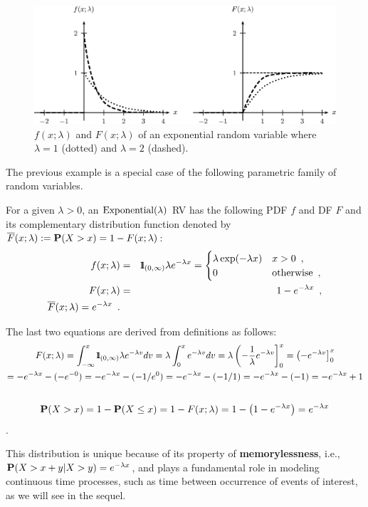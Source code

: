 \begin{figure}[htbp]
\begin{center}
\includegraphics[width=5.0in]{pstricks/exponentialLambdafF}
\caption{$f(x;\lambda)$ and $F(x;\lambda)$ of an exponential random variable where $\lambda=1$ (dotted) and $\lambda=2$ (dashed).}
\end{center}
\end{figure}


The previous example is a special case of the following parametric
family of random variables.

\begin{model}[$\exponential(\lambda)$]\label{M:exponential}
For a given $\lambda > 0$, an $\exponential(\lambda)$ RV has the following PDF $f$ and DF $F$ and its complementary distribution function denoted by $\overline{F}(x; \lambda) := \mathbf{P}(X > x) = 1-F(x;\lambda)$:
\begin{eqnarray}\label{E:Exponentialpdfcdf}
f(x; \lambda) &=& {1}\mspace{-11 mu}{1}_{(0,\infty)} \lambda e^{-\lambda x} =
\begin{cases}
\lambda \exp(-\lambda x) & x>0 \enspace ,\\
0&\textrm{otherwise} \enspace ,
\end{cases}\\
F(x; \lambda) &=& 1-e^{-\lambda x} \enspace ,\\ 
\overline{F}(x; \lambda) = e^{-\lambda x} \enspace .
\end{eqnarray}

The last two equations are derived from definitions as follows:
\begin{multline*}
F(x; \lambda) = \int_{-\infty}^{x} {1}\mspace{-11 mu}{1}_{(0,\infty)} \lambda e^{-\lambda v} dv = \lambda \int_0^x e^{-\lambda v} dv = \lambda \left( -\frac{1}{\lambda} e^{-\lambda v} \right]_0^x =  \left( - e^{-\lambda v} \right]_0^x \\ \notag
= -e^{-\lambda x} - (-e^{-0}) = -e^{-\lambda x} - (-1/e^0) = -e^{-\lambda x} - (-1/1) = -e^{-\lambda x} - (-1) = -e^{-\lambda x} + 1 \\ \notag
\end{multline*}
\[\mathbf{P}(X > x) = 1- \mathbf{P}(X \leq x) = 1- F(x; \lambda) = 1 - \left( 1-e^{-\lambda x}\right) = e^{-\lambda x}\].

This distribution is unique because of its property of {\bf memorylessness}, i.e., $\mathbf{P}(X>x+y | X > y) = e^{-\lambda x}$, and plays a fundamental role in modeling continuous time processes, such as time between occurrence of events of interest, as we will see in the sequel.
\end{model}


